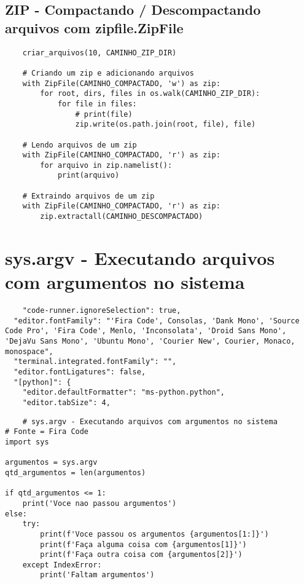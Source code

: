 \documentclass{article}
\begin{document}
\subsection{ZIP - Compactando / Descompactando arquivos com zipfile.ZipFile}
\begin{lstlisting}
    criar_arquivos(10, CAMINHO_ZIP_DIR)

    # Criando um zip e adicionando arquivos
    with ZipFile(CAMINHO_COMPACTADO, 'w') as zip:
        for root, dirs, files in os.walk(CAMINHO_ZIP_DIR):
            for file in files:
                # print(file)
                zip.write(os.path.join(root, file), file)
    
    # Lendo arquivos de um zip
    with ZipFile(CAMINHO_COMPACTADO, 'r') as zip:
        for arquivo in zip.namelist():
            print(arquivo)
    
    # Extraindo arquivos de um zip
    with ZipFile(CAMINHO_COMPACTADO, 'r') as zip:
        zip.extractall(CAMINHO_DESCOMPACTADO)
\end{lstlisting}

\section{sys.argv - Executando arquivos com argumentos no sistema}
\begin{lstlisting}
    "code-runner.ignoreSelection": true,
  "editor.fontFamily": "'Fira Code', Consolas, 'Dank Mono', 'Source Code Pro', 'Fira Code', Menlo, 'Inconsolata', 'Droid Sans Mono', 'DejaVu Sans Mono', 'Ubuntu Mono', 'Courier New', Courier, Monaco, monospace",
  "terminal.integrated.fontFamily": "",
  "editor.fontLigatures": false,
  "[python]": {
    "editor.defaultFormatter": "ms-python.python",
    "editor.tabSize": 4,
\end{lstlisting}

\begin{lstlisting}
    # sys.argv - Executando arquivos com argumentos no sistema
# Fonte = Fira Code
import sys

argumentos = sys.argv
qtd_argumentos = len(argumentos)

if qtd_argumentos <= 1:
    print('Voce nao passou argumentos')
else:
    try:
        print(f'Voce passou os argumentos {argumentos[1:]}')
        print(f'Faça alguma coisa com {argumentos[1]}')
        print(f'Faça outra coisa com {argumentos[2]}')
    except IndexError:
        print('Faltam argumentos')
\end{lstlisting}
\end{document}
